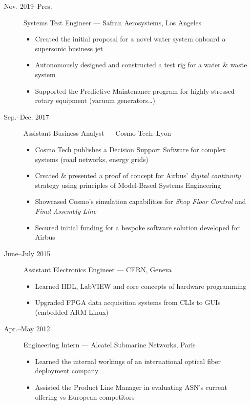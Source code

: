 \documentclass[10pt]{article}
\begin{document}
\begin{description}
\item[{Nov. 2019--Pres.}] Systems Test Engineer --- Safran Aerosystems, Los Angeles
\begin{itemize}
\item Created the initial proposal for a novel water system onboard a supersonic
business jet
\item Autonomously designed and constructed a test rig for a water \& waste system
\item Supported the Predictive Maintenance program for highly stressed rotary
equipment (vacuum generators\ldots{})
\end{itemize}

\item[{Sep.--Dec. 2017}] Assistant Business Analyst --- Cosmo Tech, Lyon
\begin{itemize}
\item Cosmo Tech publishes a Decision Support Software for complex systems (road
networks, energy grids)
\item Created \& presented a proof of concept for Airbus' \emph{digital continuity}
strategy using principles of Model-Based Systems Engineering
\item Showcased Cosmo’s simulation capabilities for \emph{Shop Floor Control} and
\emph{Final Assembly Line}
\item Secured initial funding for a bespoke software solution developed for Airbus
\end{itemize}
\item[{June--July 2015}] Assistant Electronics Engineer --- CERN, Geneva
\begin{itemize}
\item Learned HDL, LabVIEW and core concepts of hardware programming
\item Upgraded FPGA data acquisition systems from CLIs to GUIs (embedded ARM Linux)
\end{itemize}
\item[{Apr.--May 2012}] Engineering Intern --- Alcatel Submarine Networks, Paris
\begin{itemize}
\item Learned the internal workings of an international optical fiber deployment company
\item Assisted the Product Line Manager in evaluating ASN's current offering vs European competitors
\end{itemize}
\end{description}
\end{document}

